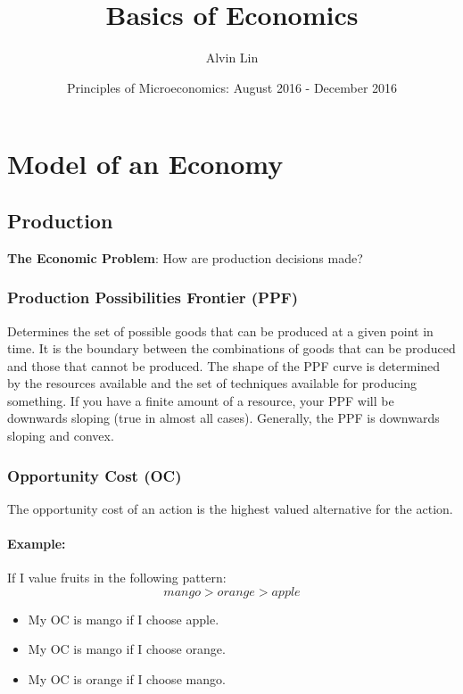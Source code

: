 \documentclass[letterpaper, 12pt]{article}
\title{Basics of Economics}
\author{Alvin Lin}
\date{Principles of Microeconomics: August 2016 - December 2016}
\begin{document}
\maketitle

\section{Model of an Economy}

\subsection{Production}
\textbf{The Economic Problem}: How are production decisions made?

\subsubsection{Production Possibilities Frontier (PPF)}
Determines the set of possible goods that can be produced at a given point in
time. It is the boundary between the combinations of goods that can be produced
and those that cannot be produced. The shape of the PPF curve is determined by
the resources available and the set of techniques available for producing
something. If you have a finite amount of a resource, your PPF will be
downwards sloping (true in almost all cases). Generally, the PPF is downwards
sloping and convex.

\subsubsection{Opportunity Cost (OC)}
The opportunity cost of an action is the highest valued alternative for
the action.

\paragraph{Example:} If I value fruits in the following pattern:
\[ mango > orange > apple \]
\begin{itemize}
  \item My OC is mango if I choose apple.
  \item My OC is mango if I choose orange.
  \item My OC is orange if I choose mango.
\end{itemize}
\end{document}

